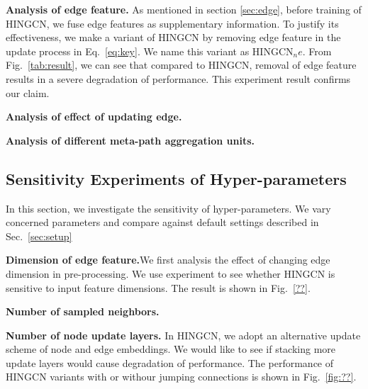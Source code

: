 \textbf{Analysis of edge feature.}
As mentioned in section \ref{sec:edge}, before training of HINGCN, we fuse edge features as supplementary information. To justify its effectiveness, we make a variant of HINGCN by removing edge feature in the update process in Eq.~\ref{eq:key}. We name this variant as HINGCN$_ne$. From Fig.~\ref{tab:result}, we can see that compared to HINGCN, removal of edge feature results in a severe degradation of performance. This experiment result confirms our claim.

\textbf{Analysis of effect of updating edge.}

\textbf{Analysis of different meta-path aggregation units.}

\subsection{Sensitivity Experiments of Hyper-parameters}
In this section, we investigate the sensitivity of hyper-parameters. We vary concerned parameters and compare against default settings described in Sec.~\ref{sec:setup} 

\textbf{Dimension of edge feature.}We first analysis the effect of changing edge dimension in pre-processing.  We use experiment to see whether HINGCN is sensitive to input feature dimensions. The result is shown in Fig.~\ref{??}.


\textbf{Number of sampled neighbors.}

\textbf{Number of node update layers.} In HINGCN, we adopt an alternative update scheme of node and edge embeddings. We would like to see if stacking more update layers would cause degradation of performance. The performance of HINGCN variants with or withour jumping connections is shown in Fig.~\ref{fig:??}. 






